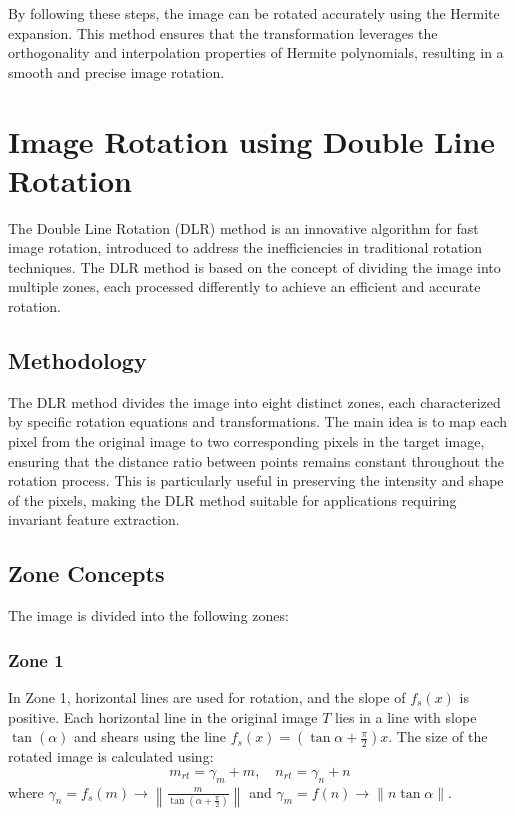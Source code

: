 \documentclass[conference]{IEEEtran}
\begin{document}
By following these steps, the image can be rotated accurately using the Hermite expansion. This method ensures that the transformation leverages the orthogonality and interpolation properties of Hermite polynomials, resulting in a smooth and precise image rotation.



\section{Image Rotation using Double Line Rotation}

The Double Line Rotation (DLR) method is an innovative algorithm for fast image rotation, 
introduced to address the inefficiencies in traditional rotation techniques. 
The DLR method is based on the concept of dividing the image into multiple zones, 
each processed differently to achieve an efficient and accurate rotation.

\subsection{Methodology}

The DLR method divides the image into eight distinct zones, each characterized by 
specific rotation equations and transformations. The main idea is to map each pixel 
from the original image to two corresponding pixels in the target image, ensuring that 
the distance ratio between points remains constant throughout the rotation process. 
This is particularly useful in preserving the intensity and shape of the pixels, 
making the DLR method suitable for applications requiring invariant feature extraction.

\subsection{Zone Concepts}

The image is divided into the following zones:

\subsubsection{Zone 1}
In Zone 1, horizontal lines are used for rotation, and the slope of \( f_s(x) \) is positive. Each horizontal line in the original image \( T \) lies in a line with slope \( \tan(\alpha) \) and shears using the line \( f_s(x) = \left(\tan \alpha + \frac{\pi}{2}\right)x \). The size of the rotated image is calculated using:
\[
m_{rt} = \gamma_m + m, \quad n_{rt} = \gamma_n + n
\]
where \( \gamma_n = f_s(m) \rightarrow \left\| \frac{m}{\tan(\alpha + \frac{\pi}{2})} \right\| \) and \( \gamma_m = f(n) \rightarrow \| n \tan \alpha \| \).
\end{document}

